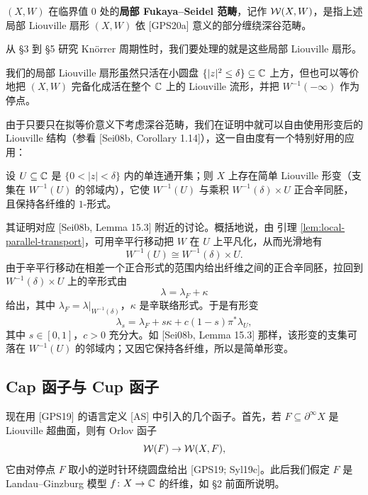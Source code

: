 \begin{definition}\label{def:local-fs}\label{def:2-2-5}
$(X,W)$ 在临界值 $0$ 处的\textbf{局部 Fukaya--Seidel 范畴}，记作 $\mathcal{W}(X,W)$，是指上述局部 Liouville 扇形 $(X,W)$ 依 [GPS20a] 意义的部分缠绕深谷范畴。
\end{definition}

从 §3 到 §5 研究 Kn{\"o}rrer 周期性时，我们要处理的就是这些局部 Liouville 扇形。

\begin{remarkx}\label{rem:6}
我们的局部 Liouville 扇形虽然只活在小圆盘 $\{|z|^2\le\delta\}\subseteq\mathbb{C}$ 上方，但也可以等价地把 $(X,W)$ 完备化成活在整个 $\mathbb{C}$ 上的 Liouville 流形，并把 $W^{-1}(-\infty)$ 作为停点。
\end{remarkx}

由于只要只在拟等价意义下考虑深谷范畴，我们在证明中就可以自由使用形变后的 Liouville 结构（参看 [Sei08b, Corollary 1.14]），这一自由度有一个特别好用的应用：

\begin{proposition}\label{prop:product-neighborhood}\label{prop:2-2-6}
设 $U\subseteq\mathbb{C}$ 是 $\{0<|z|<\delta\}$ 内的单连通开集；则 $X$ 上存在简单 Liouville 形变（支集在 $W^{-1}(U)$ 的邻域内），它使 $W^{-1}(U)$ 与乘积 $W^{-1}(\delta)\times U$ 正合辛同胚，且保持各纤维的 $1$-形式。
\end{proposition}

其证明对应 [Sei08b, Lemma 15.3] 附近的讨论。概括地说，由
引理 \ref{lem:local-parallel-transport}，可用辛平行移动把 $W$ 在 $U$ 上平凡化，从而光滑地有
\[
W^{-1}(U)\cong W^{-1}(\delta)\times U.
\]
由于辛平行移动在相差一个正合形式的范围内给出纤维之间的正合辛同胚，拉回到 $W^{-1}(\delta)\times U$ 上的辛形式由
\[
\lambda=\lambda_F+\kappa
\]
给出，其中 $\lambda_F=\lambda|_{W^{-1}(\delta)}$，$\kappa$ 是辛联络形式。于是有形变
\[
\lambda_s=\lambda_F+s\kappa+c(1-s)\pi^*\lambda_U,
\]
其中 $s\in[0,1]$，$c>0$ 充分大。如 [Sei08b, Lemma 15.3] 那样，该形变的支集可落在 $W^{-1}(U)$ 的邻域内；又因它保持各纤维，所以是简单形变。

\subsection{Cap 函子与 Cup 函子}

现在用 [GPS19] 的语言定义 [AS] 中引入的几个函子。首先，若 $F\subseteq\partial^\infty X$ 是 Liouville 超曲面，则有 Orlov 函子
\[
\mathcal{W}(F)\to\mathcal{W}(X,F),
\]
它由对停点 $F$ 取小的逆时针环绕圆盘给出 [GPS19; Syl19c]。此后我们假定 $F$ 是 Landau--Ginzburg 模型 $f\colon X\to\mathbb{C}$ 的纤维，如 §2 前面所说明。

